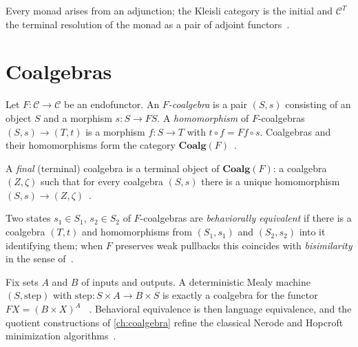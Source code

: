 \begin{remark}
Every monad arises from an adjunction; the Kleisli category is the initial
and $\mathcal{C}^T$ the terminal resolution of the monad as a pair of
adjoint functors~\cite{maclane, arxiv-monads-kleisli}.
\end{remark}

\section{Coalgebras}\label{sec:prelim-coalg}

\begin{definition}
Let $F \colon \mathcal{C} \to \mathcal{C}$ be an endofunctor. An
\emph{$F$-coalgebra} is a pair $(S, s)$ consisting of an object $S$ and a
morphism $s \colon S \to F S$. A \emph{homomorphism} of $F$-coalgebras
$(S,s) \to (T,t)$ is a morphism $f \colon S \to T$ with
$t \circ f = F f \circ s$. Coalgebras and their homomorphisms form the
category $\mathbf{Coalg} (F)$~\cite{arxiv-coalgebra-min}.
\end{definition}

\begin{definition}
A \emph{final} (terminal) coalgebra is a terminal object of
$\mathbf{Coalg} (F)$: a coalgebra $(Z, \zeta)$ such that for every coalgebra
$(S,s)$ there is a unique homomorphism $(S,s) \to (Z,\zeta)$~\cite{arxiv-coalgebra-min}.
\end{definition}

\begin{definition}
Two states $s_1 \in S_1$, $s_2 \in S_2$ of $F$-coalgebras are
\emph{behaviorally equivalent} if there is a coalgebra $(T,t)$ and
homomorphisms from $(S_1,s_1)$ and $(S_2,s_2)$ into it identifying them; when
$F$ preserves weak pullbacks this coincides with \emph{bisimilarity} in the
sense of~\cite{park, arxiv-coalgebra-min}.
\end{definition}

\begin{example}
Fix sets $A$ and $B$ of inputs and outputs. A deterministic Mealy machine
$(S, \mathrm{step})$ with $\mathrm{step} \colon S \times A \to B \times S$
is exactly a coalgebra for the functor $F X = (B \times X)^A$
~\cite{mealy, moore, arxiv-mealy}. Behavioral equivalence is then language
equivalence, and the quotient constructions of \autoref{ch:coalgebra}
refine the classical Nerode and Hopcroft minimization
algorithms~\cite{nerode, hopcroft, arxiv-coalgebra-min}.
\end{example}

